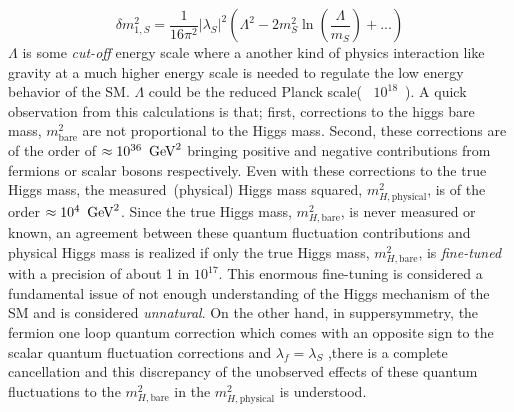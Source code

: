 \begin{equation}
\delta m^{2}_{1,S} = \frac{1}{16\pi^{2}}|\lambda_{S}|^{2}\left(\Lambda^{2} - 2m^{2}_{S}\ln\left(\frac{\Lambda}{m_{S}}\right) + ...\right) 
\end{equation}
$\Lambda$ is some \textit{cut-off} energy scale where a another kind of physics interaction like gravity at a much higher energy scale is needed to regulate the low energy behavior of the SM. $\Lambda$ could be the reduced Planck scale(~ $10^{18}$~\GeV).  A quick observation from this calculations is that; first, corrections to the higgs bare mass, $m^{2}_{\mbox{bare}}$ are not proportional to the Higgs mass.
Second, these corrections are of the order of $\approx 10^{36}~\,\text{Ge\hspace{-.08em}V}^{2}$  bringing positive and negative contributions from fermions or scalar bosons respectively.
Even with these corrections to the true Higgs mass, the measured~(physical) Higgs mass squared, $m^{2}_{H,\mbox{physical}}$, is of the order $\approx 10^{4}~\,\text{Ge\hspace{-.08em}V}^{2}$.
Since the true Higgs mass, $m^{2}_{H,\mbox{bare}}$, is never measured or known, an agreement between these quantum fluctuation contributions and physical Higgs mass is realized  if only the true Higgs mass, $m^{2}_{H,\mbox{bare}}$,  is \textit{fine-tuned} with a precision of about 1 in $10^{17}$. This enormous fine-tuning is considered a fundamental issue of not enough understanding of the Higgs mechanism of the SM and is considered \textit{unnatural}. 
On the other hand, in suppersymmetry, the fermion one loop quantum correction which comes with an opposite sign to the scalar quantum fluctuation corrections and $\lambda_{f} = \lambda_{S}$ ,there is a complete  cancellation and this discrepancy of the unobserved effects of these quantum fluctuations to the $m^{2}_{H,\mbox{bare}}$ in the $m^{2}_{H,\mbox{physical}}$ is understood. 
